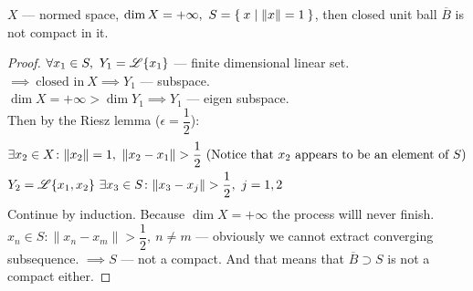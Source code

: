 \begin{cor}
  $X$ --- normed space, $\dim{X} = +\infty,\ S = \Set{x | \|x\| = 1}$, then
  closed unit ball $\overline{B}$ is not compact in it.
\end{cor}

\begin{proof}
  $\forall x_1 \in S,\ Y_1 = \mathscr{L}\{x_1\}$ --- finite dimensional linear set.
  $\implies\ \text{closed in}\ X \implies Y_1$ --- subspace. \\
  $\dim{X} = + \infty > \dim{Y_1} \implies Y_1$ --- eigen subspace. \\
  Then by the Riesz lemma ($\epsilon = \dfrac 12$):
  \begin{align*}
    & \exists x_2 \in X \colon \|x_2\| = 1,\ \|x_2 - x_1\| > \dfrac 12\ \textnormal{(Notice that $x_2$ appears to be an element of $S$)} \\
    & Y_2 = \mathscr{L}\{x_1, x_2\}\ \exists x_3 \in S\colon \|x_3 - x_j\| > \dfrac 12,\ j = 1,2
  \end{align*}
  Continue by induction. Because $\dim{X} = + \infty$ the process willl never
  finish. \\
  $x_n \in S \colon \|x_n - x_m\| > \dfrac 12,\ n \neq m$ --- obviously we
  cannot extract converging subsequence. $\implies S$ --- not a compact. And
  that means that $\overline{B} \supset S$ is not a compact either. 
\end{proof}
